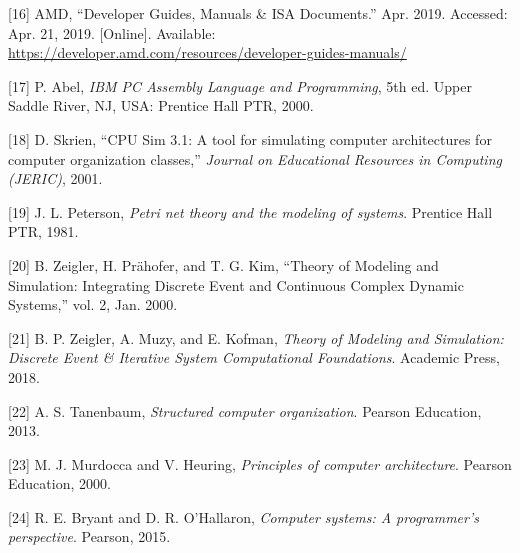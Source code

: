 \documentclass[12pt,oneside]{templates/unerthesis}
\newcommand{\CSLLeftMargin}[1]{#1} %
\newcommand{\CSLRightInline}[1]{#1} %
\newlength{\cslhangindent}
\newenvironment{CSLReferences}[2] %
 {\setlength{\parindent}{0pt}%
  \setlength{\leftskip}{#1 pt\relax}%
  \setlength{\parskip}{#2 pt\relax}%
  \everypar{\setlength{\hangindent}{\cslhangindent}}}
 {\par}
\begin{document}
\begin{CSLReferences}{0}{0}
\leavevmode{}%
\CSLLeftMargin{{[}16{]} }%
\CSLRightInline{AMD, {``Developer {Guides}, {Manuals} \& {ISA} {Documents}.''} Apr. 2019. Accessed: Apr. 21, 2019. {[}Online{]}. Available: \url{https://developer.amd.com/resources/developer-guides-manuals/}}

\leavevmode{}%
\CSLLeftMargin{{[}17{]} }%
\CSLRightInline{P. Abel, \emph{{IBM} {PC} {Assembly} {Language} and {Programming}}, 5th ed. Upper Saddle River, NJ, USA: Prentice Hall PTR, 2000.}

\leavevmode{}%
\CSLLeftMargin{{[}18{]} }%
\CSLRightInline{D. Skrien, {``{CPU} {Sim} 3.1: {A} tool for simulating computer architectures for computer organization classes,''} \emph{Journal on Educational Resources in Computing (JERIC)}, 2001.}

\leavevmode{}%
\CSLLeftMargin{{[}19{]} }%
\CSLRightInline{J. L. Peterson, \emph{Petri net theory and the modeling of systems}. Prentice Hall PTR, 1981.}

\leavevmode{}%
\CSLLeftMargin{{[}20{]} }%
\CSLRightInline{B. Zeigler, H. Prähofer, and T. G. Kim, {``Theory of {Modeling} and {Simulation}: {Integrating} {Discrete} {Event} and {Continuous} {Complex} {Dynamic} {Systems},''} vol. 2, Jan. 2000.}

\leavevmode{}%
\CSLLeftMargin{{[}21{]} }%
\CSLRightInline{B. P. Zeigler, A. Muzy, and E. Kofman, \emph{Theory of {Modeling} and {Simulation}: {Discrete} {Event} \& {Iterative} {System} {Computational} {Foundations}}. Academic Press, 2018.}

\leavevmode{}%
\CSLLeftMargin{{[}22{]} }%
\CSLRightInline{A. S. Tanenbaum, \emph{Structured computer organization}. Pearson Education, 2013.}

\leavevmode{}%
\CSLLeftMargin{{[}23{]} }%
\CSLRightInline{M. J. Murdocca and V. Heuring, \emph{Principles of computer architecture}. Pearson Education, 2000.}

\leavevmode{}%
\CSLLeftMargin{{[}24{]} }%
\CSLRightInline{R. E. Bryant and D. R. O'Hallaron, \emph{Computer systems: A programmer's perspective}. Pearson, 2015.}


\end{CSLReferences}
\end{document}
